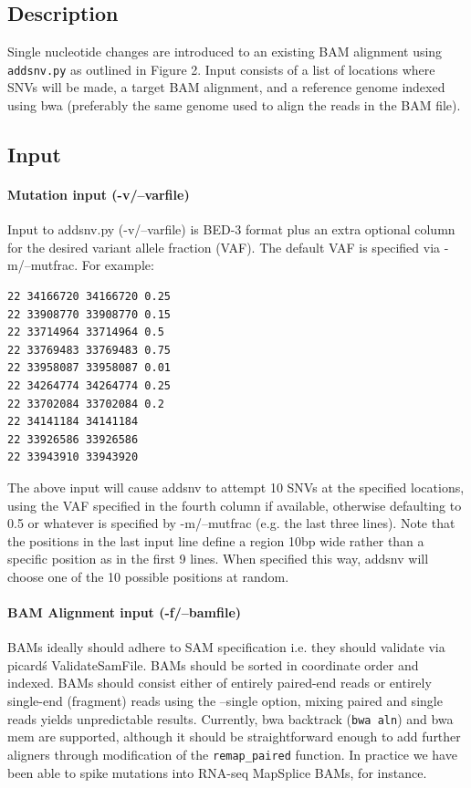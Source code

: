 \documentclass[letterpaper,11pt]{article}
\begin{document}
\subsection{Description}
    Single nucleotide changes are introduced to an existing BAM alignment using \texttt {addsnv.py} as outlined in Figure 2. Input consists of a list of locations where SNVs will be made, a target BAM alignment, and a reference genome indexed using bwa (preferably the same genome used to align the reads in the BAM file). 

\subsection{Input}
\paragraph{Mutation input (-v/--varfile)}
	Input to addsnv.py (-v/--varfile) is BED-3 format plus an extra optional column for the desired variant allele fraction (VAF). The default VAF is specified via -m/--mutfrac. For example:
\begin{verbatim}
22 34166720 34166720 0.25
22 33908770 33908770 0.15
22 33714964 33714964 0.5
22 33769483 33769483 0.75
22 33958087 33958087 0.01
22 34264774 34264774 0.25
22 33702084 33702084 0.2
22 34141184 34141184
22 33926586 33926586
22 33943910 33943920
\end{verbatim}

    The above input will cause addsnv to attempt 10 SNVs at the specified locations, using the VAF specified in the fourth column if available, otherwise defaulting to 0.5 or whatever is specified by -m/--mutfrac (e.g. the last three lines). Note that the positions in the last input line define a region 10bp wide rather than a specific position as in the first 9 lines. When specified this way, addsnv will choose one of the 10 possible positions at random. 

\paragraph{BAM Alignment input (-f/--bamfile)}
	BAMs ideally should adhere to SAM specification i.e. they should validate via picard\'s ValidateSamFile. BAMs should be sorted in coordinate order and indexed. BAMs should consist either of entirely paired-end reads or entirely single-end (fragment) reads using the --single option, mixing paired and single reads yields unpredictable results. Currently, bwa backtrack (\texttt{bwa aln}) and bwa mem are supported, although it should be straightforward enough to add further aligners through modification of the \texttt{remap\_paired} function. In practice we have been able to spike mutations into RNA-seq MapSplice BAMs, for instance.
\end{document}

